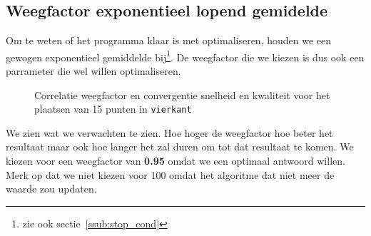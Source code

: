 \subsection{Weegfactor exponentieel lopend gemidelde}
\label{sub:weightingFactor}
Om te weten of het programma klaar is met optimaliseren, houden we een gewogen exponentieel gemiddelde bij\footnote{zie ook sectie~\ref{ssub:stop_cond}}. De weegfactor die we kiezen is dus ook een parrameter die wel willen optimaliseren.
\begin{figure}[H]
\caption{Correlatie weegfactor en convergentie snelheid en kwaliteit voor het plaatsen van 15 punten in \texttt{vierkant}}
\label{graf:weightingFactor}
\end{figure}
We zien wat we verwachten te zien. Hoe hoger de weegfactor hoe beter het resultaat maar ook hoe langer het zal duren om tot dat resultaat te komen. 
We kiezen voor een weegfactor van \textbf{0.95} omdat we een optimaal antwoord willen. Merk op dat we niet kiezen voor 100 omdat het algoritme dat niet meer de waarde zou updaten. 
%
